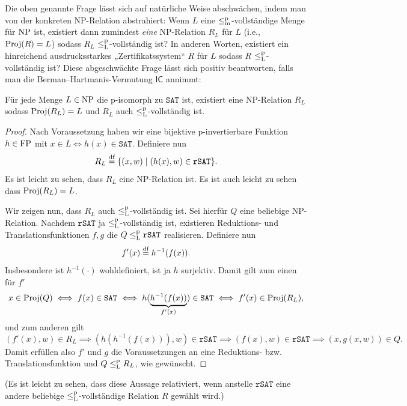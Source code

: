Die oben genannte Frage lässt sich auf natürliche Weise abschwächen, indem man von der konkreten NP-Relation abstrahiert: Wenn $L$ eine $\leq_\mathrm{m}^\mathrm{p}$-vollständige Menge für $\mathrm{NP}$ ist, existiert dann zumindest \emph{eine} NP-Relation $R_L$ für $L$ (i.e., $\operatorname{Proj}(R)=L$) sodass $R_L$ $\leq_\mathrm{L}^\mathrm{p}$-vollständig ist? In anderen Worten, existiert ein hinreichend ausdrucksstarkes „Zertifikatssystem“ $R$ für $L$ sodass $R$ $\leq_\mathrm{L}^\mathrm{p}$-vollständig ist?
Diese abgeschwächte Frage lässt sich positiv beantworten, falls man die Berman--Hartmanis-Vermutung $\mathsf{IC}$ annimmt:
\begin{observation}\label{obs:isomorphs-sind-leqlp-vollst}
    Für jede Menge $L\in \mathrm{NP}$ die p-isomorph zu $\mathtt{SAT}$ ist, existiert eine NP-Relation $R_L$ sodass $\operatorname{Proj}(R_L)=L$ und $R_L$ auch $\leq_\mathrm{L}^\mathrm{p}$-vollständig ist.
\end{observation}
\begin{proof}
    Nach Voraussetzung haben wir eine bijektive p-invertierbare Funktion $h\in\mathrm{FP}$ mit $x\in L \iff h(x) \in \mathtt{SAT}$.
    Definiere nun
    \[ R_L \stackrel{\text{df}}{=} \{ (x,w) \mid (h(x), w)\in \mathtt{rSAT}\}. \]
    Es ist leicht zu sehen, dass $R_L$ eine NP-Relation ist. Es ist auch leicht zu sehen dass $\operatorname{Proj}(R_L)=L$.

    Wir zeigen nun, dass $R_L$ auch $\leq_\mathrm{L}^\mathrm{p}$-vollständig ist. Sei hierfür $Q$ eine beliebige NP-Relation. Nachdem $\mathtt{rSAT}$ ja $\leq_\mathrm{L}^\mathrm{p}$-vollständig ist, existieren Reduktions- und Translationsfunktionen $f,g$ die $Q\leq_\mathrm{L}^\mathrm{p} \mathtt{rSAT}$ realisieren.
    Definiere nun
    \[ f'(x) \stackrel{\text{df}}{=} h^{-1}(f(x)). \]
    Insbesondere ist $h^{-1}(\cdot)$ wohldefiniert, ist ja $h$ surjektiv.
    Damit gilt zum einen für $f'$
    \[ x\in \operatorname{Proj}(Q) \iff f(x) \in \mathtt{SAT} \iff h(\underbrace{h^{-1}(f(x))}_{f'(x)}) \in \mathtt{SAT} \iff f'(x) \in \operatorname{Proj}(R_L), \]
    und zum anderen gilt
    \[ (f'(x), w) \in R_L \implies (h(h^{-1}(f(x))), w)\in \mathtt{rSAT} \implies (f(x), w)\in \mathtt{rSAT} \implies (x, g(x, w))\in Q.  \]
    Damit erfüllen also $f'$ und $g$ die Voraussetzungen an eine Reduktions- bzw. Translationsfunktion und $Q\leq_\mathrm{L}^\mathrm{p} R_L$, wie gewünscht.
\end{proof}
(Es ist leicht zu sehen, dass diese Aussage relativiert, wenn anstelle $\mathtt{rSAT}$ eine andere beliebige $\leq_\mathrm{L}^\mathrm{p}$-vollständige Relation $R$ gewählt wird.)

